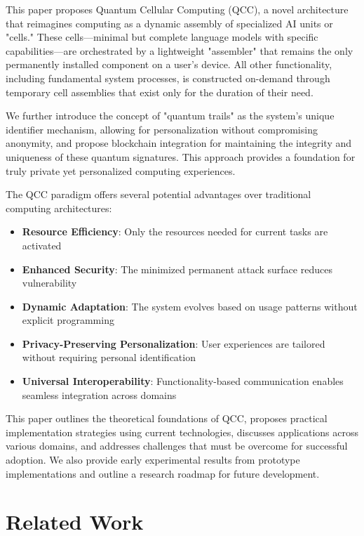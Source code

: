 \documentclass[11pt,a4paper]{article}
\begin{document}
This paper proposes Quantum Cellular Computing (QCC), a novel architecture that reimagines computing as a dynamic assembly of specialized AI units or "cells." These cells—minimal but complete language models with specific capabilities—are orchestrated by a lightweight "assembler" that remains the only permanently installed component on a user's device. All other functionality, including fundamental system processes, is constructed on-demand through temporary cell assemblies that exist only for the duration of their need.

We further introduce the concept of "quantum trails" as the system's unique identifier mechanism, allowing for personalization without compromising anonymity, and propose blockchain integration for maintaining the integrity and uniqueness of these quantum signatures. This approach provides a foundation for truly private yet personalized computing experiences.

The QCC paradigm offers several potential advantages over traditional computing architectures:

\begin{itemize}
    \item \textbf{Resource Efficiency}: Only the resources needed for current tasks are activated
    \item \textbf{Enhanced Security}: The minimized permanent attack surface reduces vulnerability
    \item \textbf{Dynamic Adaptation}: The system evolves based on usage patterns without explicit programming
    \item \textbf{Privacy-Preserving Personalization}: User experiences are tailored without requiring personal identification
    \item \textbf{Universal Interoperability}: Functionality-based communication enables seamless integration across domains
\end{itemize}

This paper outlines the theoretical foundations of QCC, proposes practical implementation strategies using current technologies, discusses applications across various domains, and addresses challenges that must be overcome for successful adoption. We also provide early experimental results from prototype implementations and outline a research roadmap for future development.

\section{Related Work}
\end{document}
